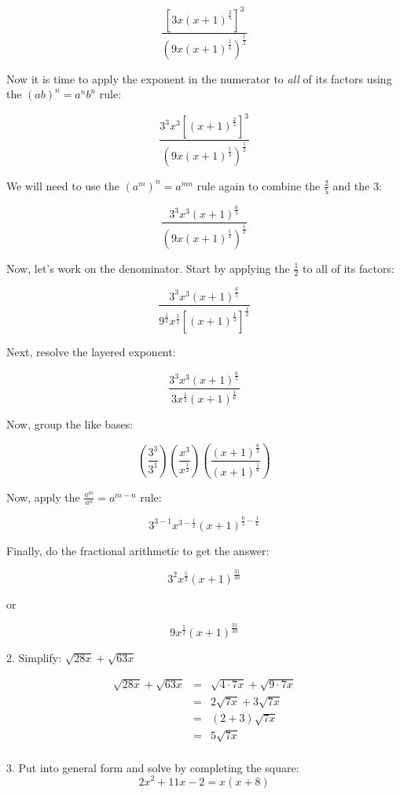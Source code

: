 \documentclass[letterpaper, 12pt]{article}
\begin{document}
\[\frac{\left[3x(x+1)^{\frac{2}{5}}\right]^3}{(9x(x+1)^{\frac{1}{3}})^{\frac{1}{2}}}\]

Now it is time to apply the exponent in the numerator to \emph{all} of its
factors using the $(ab)^n=a^nb^n$ rule:

\[\frac{3^3x^3\left[(x+1)^{\frac{2}{5}}\right]^3}
{(9x(x+1)^{\frac{1}{3}})^{\frac{1}{2}}}\]

We will need to use the $(a^m)^n=a^{mn}$ rule again to combine the $\frac{2}{5}$
and the $3$:

\[\frac{3^3x^3(x+1)^{\frac{6}{5}}}{(9x(x+1)^{\frac{1}{3}})^{\frac{1}{2}}}\]

Now, let's work on the denominator. Start by applying the $\frac{1}{2}$ to all
of its factors:

\[\frac{3^3x^3(x+1)^{\frac{6}{5}}}
{9^{\frac{1}{2}}x^{\frac{1}{2}}\left[(x+1)^{\frac{1}{3}}\right]^{\frac{1}{2}}}\]

Next, resolve the layered exponent:

\[\frac{3^3x^3(x+1)^{\frac{6}{5}}}{3x^{\frac{1}{2}}(x+1)^{\frac{1}{6}}}\]

Now, group the like bases:

\[\left(\frac{3^3}{3^1}\right)
\left(\frac{x^3}{x^{\frac{1}{2}}}\right)
\left(\frac{(x+1)^{\frac{6}{5}}}{(x+1)^{\frac{1}{6}}}\right)\]

Now, apply the $\frac{a^m}{a^n}=a^{m-n}$ rule:

\[3^{3-1}x^{3-\frac{1}{2}}(x+1)^{\frac{6}{5}-\frac{1}{6}}\]

Finally, do the fractional arithmetic to get the answer:

\[3^2x^{\frac{5}{2}}(x+1)^{\frac{31}{30}}\]

or

\[9x^{\frac{5}{2}}(x+1)^{\frac{31}{30}}\]

\bigskip

2. Simplify: $\sqrt{28x}+\sqrt{63x}$

\begin{eqnarray*}
\sqrt{28x}+\sqrt{63x} &=& \sqrt{4\cdot7x}+\sqrt{9\cdot7x} \\
                      &=& 2\sqrt{7x}+3\sqrt{7x} \\
                      &=& (2+3)\sqrt{7x} \\
                      &=& 5\sqrt{7x} \\
\end{eqnarray*}

\bigskip

3. Put into general form and solve by completing the square:
\[2x^2+11x-2=x(x+8)\]
\end{document}
